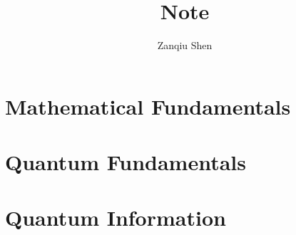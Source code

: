 \documentclass[a4paper,11pt,openany]{book}
\begin{document}
\title{\textbf{Note}}
\author{Zanqiu Shen}
\maketitle
%
\tableofcontents

\setcounter{chapter}{0}
\part{Mathematical Fundamentals}



\part{Quantum Fundamentals}




\part{Quantum Information}



\end{document}
